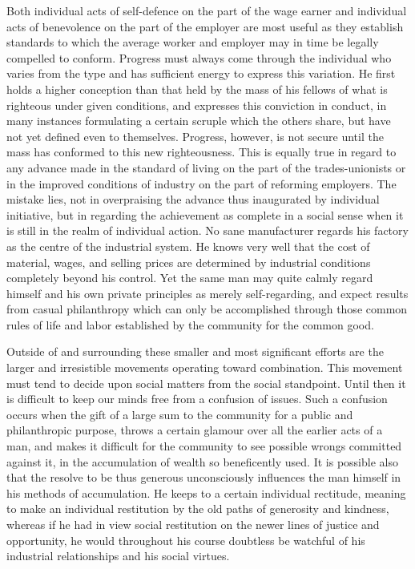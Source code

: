 \documentclass[]{article}
\begin{document}
\begin{sectionbody}
\addamsparagraph Both individual acts of self-defence on the part of the wage earner and
individual acts of benevolence on the part of the employer are most
useful as they establish standards to which the average worker and
employer may in time be legally compelled to conform. Progress must
always come through the individual who varies from the type and has
sufficient energy to express this variation. He first holds a higher
conception than that held by the mass of his fellows of what is
righteous under given conditions, and expresses this conviction in
conduct, in many instances formulating a certain scruple which the
others share, but have not yet defined even to themselves. Progress,
however, is not secure until the mass has conformed to this new
righteousness. This is equally true in regard to any advance made in the
standard of living on the part of the trades-unionists or in the
improved conditions of industry on the part of reforming employers. The
mistake lies, not in overpraising the advance thus inaugurated by
individual initiative, but in regarding the achievement as complete in a
social sense when it is still in the realm of individual action. No sane
manufacturer regards his factory as the centre of the industrial system.
He knows very well that the cost of material, wages, and selling prices
are determined by industrial conditions completely beyond his control.
Yet the same man may quite calmly regard himself and his own private
principles as merely self-regarding, and expect results from casual
philanthropy which can only be accomplished through those common rules
of life and labor established by the community for the common good.

\addamsparagraph Outside of and surrounding these smaller and most significant efforts
are the larger and irresistible movements operating toward combination.
This movement must tend to decide upon social matters from the social
standpoint. Until then it is difficult to keep our minds free from a
confusion of issues. Such a confusion occurs when the gift of a large
sum to the community for a public and philanthropic purpose, throws a
certain glamour over all the earlier acts of a man, and makes it
difficult for the community to see possible wrongs committed against it,
in the accumulation of wealth so beneficently used. It is possible also
that the resolve to be thus generous unconsciously influences the man
himself in his methods of accumulation. He keeps to a certain individual
rectitude, meaning to make an individual restitution by the old paths of
generosity and kindness, whereas if he had in view social restitution on
the newer lines of justice and opportunity, he would throughout his
course doubtless be watchful of his industrial relationships and his
social virtues.


\end{sectionbody}
\end{document}
